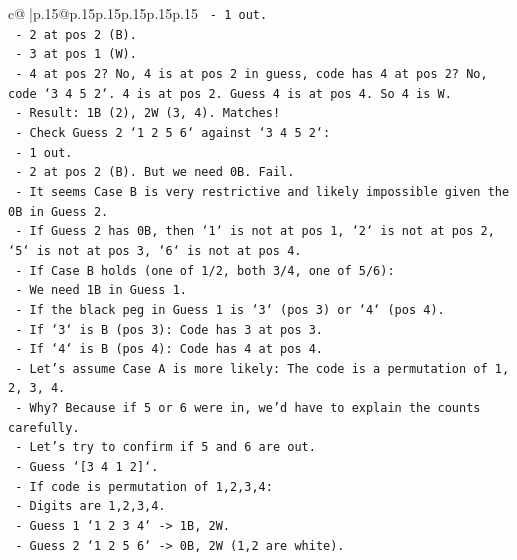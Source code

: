 \documentclass{article}
\begin{document}
{\begin{supertabular}{c@{$\;$}|p{.15\linewidth}@{}p{.15\linewidth}p{.15\linewidth}p{.15\linewidth}p{.15\linewidth}p{.15\linewidth}}
{{{\texttt{                    {-} 1 out.} \\
\texttt{                    {-} 2 at pos 2 (B).} \\
\texttt{                    {-} 3 at pos 1 (W).} \\
\texttt{                    {-} 4 at pos 2? No, 4 is at pos 2 in guess, code has 4 at pos 2? No, code `3 4 5 2`. 4 is at pos 2. Guess 4 is at pos 4. So 4 is W.} \\
\texttt{                    {-} Result: 1B (2), 2W (3, 4). Matches!} \\
\texttt{                    {-} Check Guess 2 `1 2 5 6` against `3 4 5 2`:} \\
\texttt{                    {-} 1 out.} \\
\texttt{                    {-} 2 at pos 2 (B). But we need 0B. Fail.} \\
\texttt{    {-} It seems Case B is very restrictive and likely impossible given the 0B in Guess 2.} \\
\texttt{    {-} If Guess 2 has 0B, then `1` is not at pos 1, `2` is not at pos 2, `5` is not at pos 3, `6` is not at pos 4.} \\
\texttt{    {-} If Case B holds (one of 1/2, both 3/4, one of 5/6):} \\
\texttt{        {-} We need 1B in Guess 1.} \\
\texttt{        {-} If the black peg in Guess 1 is `3` (pos 3) or `4` (pos 4).} \\
\texttt{        {-} If `3` is B (pos 3): Code has 3 at pos 3.} \\
\texttt{        {-} If `4` is B (pos 4): Code has 4 at pos 4.} \\
\texttt{        {-} Let's assume Case A is more likely: The code is a permutation of 1, 2, 3, 4.} \\
\texttt{        {-} Why? Because if 5 or 6 were in, we'd have to explain the counts carefully.} \\
\texttt{        {-} Let's try to confirm if 5 and 6 are out.} \\
\texttt{        {-} Guess `{[}3 4 1 2{]}`.} \\
\texttt{        {-} If code is permutation of 1,2,3,4:} \\
\texttt{            {-} Digits are 1,2,3,4.} \\
\texttt{            {-} Guess 1 `1 2 3 4` {-}> 1B, 2W.} \\
\texttt{            {-} Guess 2 `1 2 5 6` {-}> 0B, 2W (1,2 are white).} \\
}}}
\end{supertabular}}
\end{document}
